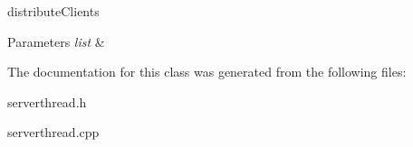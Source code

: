 distribute\-Clients 


\begin{DoxyParams}{Parameters}
{\em list} & \\
\hline
\end{DoxyParams}


The documentation for this class was generated from the following files\-:\begin{DoxyCompactItemize}
\item 
serverthread.\-h\item 
serverthread.\-cpp\end{DoxyCompactItemize}
